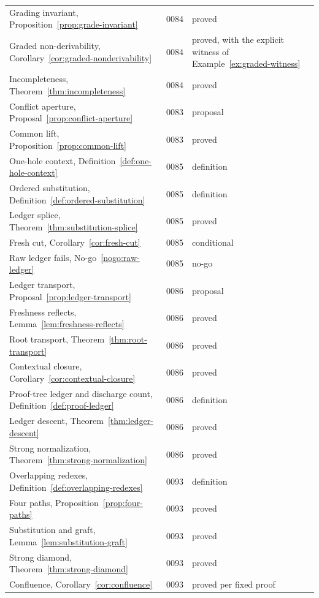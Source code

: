\begin{longtable}{@{}p{}p{}p{}@{}}
Grading invariant, Proposition~\ref{prop:grade-invariant} & 0084 & proved \\
Graded non-derivability, Corollary~\ref{cor:graded-nonderivability} & 0084 & proved,
  with the explicit witness of Example~\ref{ex:graded-witness} \\
Incompleteness, Theorem~\ref{thm:incompleteness} & 0084 & proved \\
Conflict aperture, Proposal~\ref{prop:conflict-aperture} & 0083 & proposal \\
Common lift, Proposition~\ref{prop:common-lift} & 0083 & proved \\
One-hole context, Definition~\ref{def:one-hole-context} & 0085 & definition \\
Ordered substitution, Definition~\ref{def:ordered-substitution} & 0085 & definition \\
Ledger splice, Theorem~\ref{thm:substitution-splice} & 0085 & proved \\
Fresh cut, Corollary~\ref{cor:fresh-cut} & 0085 & conditional \\
Raw ledger fails, No-go~\ref{nogo:raw-ledger} & 0085 & no-go \\
Ledger transport, Proposal~\ref{prop:ledger-transport} & 0086 & proposal \\
Freshness reflects, Lemma~\ref{lem:freshness-reflects} & 0086 & proved \\
Root transport, Theorem~\ref{thm:root-transport} & 0086 & proved \\
Contextual closure, Corollary~\ref{cor:contextual-closure} & 0086 & proved \\
Proof-tree ledger and discharge count, Definition~\ref{def:proof-ledger} & 0086 &
  definition \\
Ledger descent, Theorem~\ref{thm:ledger-descent} & 0086 & proved \\
Strong normalization, Theorem~\ref{thm:strong-normalization} & 0086 & proved \\
Overlapping redexes, Definition~\ref{def:overlapping-redexes} & 0093 & definition \\
Four paths, Proposition~\ref{prop:four-paths} & 0093 & proved \\
Substitution and graft, Lemma~\ref{lem:substitution-graft} & 0093 & proved \\
Strong diamond, Theorem~\ref{thm:strong-diamond} & 0093 & proved \\
Confluence, Corollary~\ref{cor:confluence} & 0093 & proved per fixed proof \\

\end{longtable}
